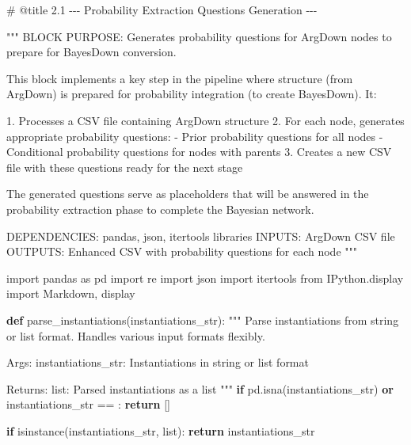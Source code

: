 \documentclass[
  11pt,
  letterpaper,
]{book}
\newenvironment{Shaded}{\begin{snugshade}}{\end{snugshade}}
\newcommand{\BuiltInTok}[1]{\textcolor[rgb]{0.00,0.23,0.31}{#1}}
\newcommand{\CommentTok}[1]{\textcolor[rgb]{0.37,0.37,0.37}{#1}}
\newcommand{\ControlFlowTok}[1]{\textcolor[rgb]{0.00,0.23,0.31}{\textbf{#1}}}
\newcommand{\ImportTok}[1]{\textcolor[rgb]{0.00,0.46,0.62}{#1}}
\newcommand{\KeywordTok}[1]{\textcolor[rgb]{0.00,0.23,0.31}{\textbf{#1}}}
\newcommand{\NormalTok}[1]{\textcolor[rgb]{0.00,0.23,0.31}{#1}}
\newcommand{\OperatorTok}[1]{\textcolor[rgb]{0.37,0.37,0.37}{#1}}
\newcommand{\StringTok}[1]{\textcolor[rgb]{0.13,0.47,0.30}{#1}}
\begin{document}
\begin{Shaded}
\begin{Highlighting}[]
\CommentTok{\# @title 2.1 {-}{-}{-} Probability Extraction Questions Generation {-}{-}{-}}

\CommentTok{"""}
\CommentTok{BLOCK PURPOSE: Generates probability questions for ArgDown nodes to prepare for BayesDown conversion.}

\CommentTok{This block implements a key step in the pipeline where structure (from ArgDown) is prepared}
\CommentTok{for probability integration (to create BayesDown). It:}

\CommentTok{1. Processes a CSV file containing ArgDown structure}
\CommentTok{2. For each node, generates appropriate probability questions:}
\CommentTok{   {-} Prior probability questions for all nodes}
\CommentTok{   {-} Conditional probability questions for nodes with parents}
\CommentTok{3. Creates a new CSV file with these questions ready for the next stage}

\CommentTok{The generated questions serve as placeholders that will be answered in the}
\CommentTok{probability extraction phase to complete the Bayesian network.}

\CommentTok{DEPENDENCIES: pandas, json, itertools libraries}
\CommentTok{INPUTS: ArgDown CSV file}
\CommentTok{OUTPUTS: Enhanced CSV with probability questions for each node}
\CommentTok{"""}

\ImportTok{import}\NormalTok{ pandas }\ImportTok{as}\NormalTok{ pd}
\ImportTok{import}\NormalTok{ re}
\ImportTok{import}\NormalTok{ json}
\ImportTok{import}\NormalTok{ itertools}
\ImportTok{from}\NormalTok{ IPython.display }\ImportTok{import}\NormalTok{ Markdown, display}


\KeywordTok{def}\NormalTok{ parse\_instantiations(instantiations\_str):}
    \CommentTok{"""}
\CommentTok{    Parse instantiations from string or list format.}
\CommentTok{    Handles various input formats flexibly.}

\CommentTok{    Args:}
\CommentTok{        instantiations\_str: Instantiations in string or list format}

\CommentTok{    Returns:}
\CommentTok{        list: Parsed instantiations as a list}
\CommentTok{    """}
    \ControlFlowTok{if}\NormalTok{ pd.isna(instantiations\_str) }\KeywordTok{or}\NormalTok{ instantiations\_str }\OperatorTok{==} \StringTok{\textquotesingle{}\textquotesingle{}}\NormalTok{:}
        \ControlFlowTok{return}\NormalTok{ []}

    \ControlFlowTok{if} \BuiltInTok{isinstance}\NormalTok{(instantiations\_str, }\BuiltInTok{list}\NormalTok{):}
        \ControlFlowTok{return}\NormalTok{ instantiations\_str}


\end{Highlighting}
\end{Shaded}
\end{document}
